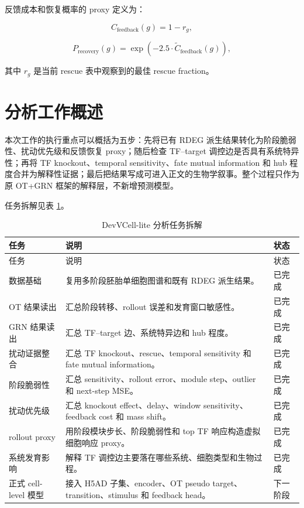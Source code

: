 \documentclass[UTF8,12pt]{ctexart}
\newcommand{\RDEG}{\textsc{RDEG}}
\newcommand{\OT}{\textsc{OT}}
\newcommand{\GRN}{\textsc{GRN}}
\begin{document}
反馈成本和恢复概率的 proxy 定义为：

\begin{equation}
C_{\mathrm{feedback}}(g)=1-r_g,
\end{equation}

\begin{equation}
P_{\mathrm{recovery}}(g)=\exp(-2.5 \cdot \widetilde{C}_{\mathrm{feedback}}(g)),
\end{equation}

其中 $r_g$ 是当前 rescue 表中观察到的最佳 rescue fraction。

\section{分析工作概述}

本次工作的执行重点可以概括为五步：先将已有 \RDEG{} 派生结果转化为阶段脆弱性、扰动优先级和反馈恢复 proxy；随后检查 TF--target 调控边是否具有系统特异性；再将 TF knockout、temporal sensitivity、fate mutual information 和 hub 程度合并为解释性证据；最后把结果写成可进入正文的生物学叙事。整个过程只作为原 \OT{}+\GRN{} 框架的解释层，不新增预测模型。

任务拆解见表 \ref{tab:code-plan}。

\begin{longtable}{>{\raggedright\arraybackslash}p{4.2cm} >{\raggedright\arraybackslash}p{8.5cm} >{\raggedright\arraybackslash}p{2.5cm}}
\caption{DevVCell-lite 分析任务拆解}
\label{tab:code-plan}\\
\toprule
任务 & 说明 & 状态 \\
\midrule
\endfirsthead
\toprule
任务 & 说明 & 状态 \\
\midrule
\endhead
数据基础 & 复用多阶段胚胎单细胞图谱和既有 \RDEG{} 派生结果。 & 已完成 \\
\OT{} 结果读出 & 汇总阶段转移、rollout 误差和发育窗口敏感性。 & 已完成 \\
\GRN{} 结果读出 & 汇总 TF--target 边、系统特异边和 hub 程度。 & 已完成 \\
扰动证据整合 & 汇总 TF knockout、rescue、temporal sensitivity 和 fate mutual information。 & 已完成 \\
阶段脆弱性 & 汇总 sensitivity、rollout error、module step、outlier 和 next-step MSE。 & 已完成 \\
扰动优先级 & 汇总 knockout effect、delay、window sensitivity、feedback cost 和 mass shift。 & 已完成 \\
rollout proxy & 用阶段模块步长、阶段脆弱性和 top TF 响应构造虚拟细胞响应 proxy。 & 已完成 \\
系统发育影响 & 解释 TF 调控边主要落在哪些系统、细胞类型和生物过程。 & 已完成 \\
正式 cell-level 模型 & 接入 H5AD 子集、encoder、OT pseudo target、transition、stimulus 和 feedback head。 & 下一阶段 \\
\bottomrule
\end{longtable}
\end{document}

